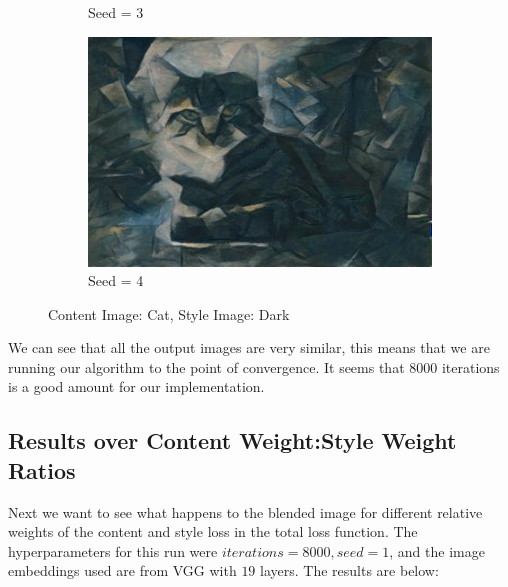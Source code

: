 \documentclass{article}
\begin{document}
\begin{figure}[H]
\begin{subfigure}{.5\textwidth}
  \caption{Seed = 3}
  \label{fig:sfig3}
\end{subfigure}
\begin{subfigure}{.5\textwidth}
  \centering
  \includegraphics[width=.8\linewidth]{cat_dark4}
  \caption{Seed = 4}
  \label{fig:sfig4}
\end{subfigure}
\caption{Content Image: Cat, Style Image: Dark}
\label{fig:fig}
\end{figure}

\noindent We can see that all the output images are very similar, this means that we are running our algorithm to the point of convergence. It seems that 8000 iterations is a good amount for our implementation.

\subsection{Results over Content Weight:Style Weight Ratios}

Next we want to see what happens to the blended image for different relative weights of the content and style loss in the total loss function. The hyperparameters for this run were $iterations = 8000, seed = 1$, and the image embeddings used are from VGG with $19$ layers. The results are below:
\end{document}
